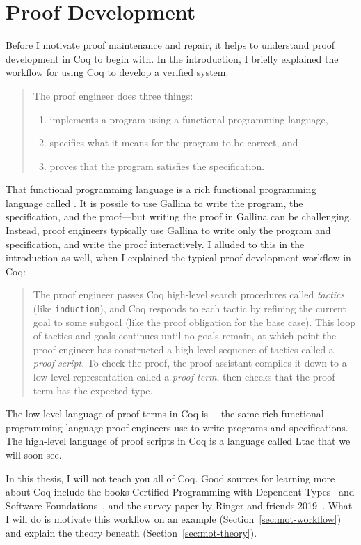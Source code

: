 \section{Proof Development}
\label{sec:mot-dev}

Before I motivate proof maintenance and repair, it helps to understand proof development in Coq to begin with.
In the introduction, I briefly explained the workflow for using Coq to develop a verified system:

\begin{quote}
The proof engineer does three things:

\begin{enumerate}
\item implements a program using a functional programming language,
\item specifies what it means for the program to be correct, and
\item proves that the program satisfies the specification.
\end{enumerate}
\end{quote}
That functional programming language is a rich functional programming language called .
It is possile to use Gallina to write the program, the specification, and the proof---but writing the proof in Gallina can be challenging.
Instead, proof engineers typically use Gallina to write only the program and specification,
and write the proof interactively.
I alluded to this in the introduction as well, when I explained the typical proof development workflow in Coq:

\begin{quote}
The proof engineer passes Coq high-level search procedures called \textit{tactics} (like \lstinline{induction}), and Coq responds to each tactic
by refining the current goal to some subgoal (like the proof obligation for the base case). This loop of tactics and goals 
continues until no goals remain, at which point the proof engineer has constructed a high-level sequence of tactics called a \textit{proof script}.
To check the proof, the proof assistant compiles it down to a low-level representation called a \textit{proof term},
then checks that the proof term has the expected type.
\end{quote}
The low-level language of proof terms in Coq is ---the same rich functional programming language proof engineers use to write programs and specifications.
The high-level language of proof scripts in Coq is a language called Ltac that we will soon see.

In this thesis, I will not teach you all of Coq.
Good sources for learning more about Coq include the books Certified Programming with Dependent Types~\cite{chlipala:cpdt}
and Software Foundations~\cite{software-foundations}, and the survey paper by Ringer and friends 2019~\cite{PGL-045}.
What I will do is motivate this workflow on an example (Section~\ref{sec:mot-workflow})
and explain the theory beneath (Section~\ref{sec:mot-theory}).





